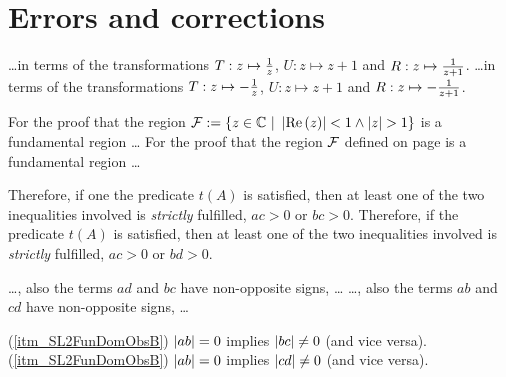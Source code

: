\chapter{Errors and corrections}

\begin{description}
{\dots in terms of the transformations $T : z \mapsto \frac{1}{z}$, $U : z \mapsto z+1$ and $R : z \mapsto \frac{1}{z+1}$.}
{\dots in terms of the transformations $T : z \mapsto -\frac{1}{z}$, $U : z \mapsto z+1$ and $R : z \mapsto -\frac{1}{z+1}$.}

{For the proof that the region $\mathcal{F} := \{ z \in \mathbb{C} \ | \ \left|\operatorname{Re}\left(z\right)\right| < 1 \land \left|z\right| > 1 \}$ is a fundamental region \dots}
{For the proof that the region $\mathcal{F}$ defined on page \pageref{eqn_PSL2FunDom} is a fundamental region \dots}

{Therefore, if one the predicate $t(A)$ is satisfied, then at least one of the two inequalities involved is \emph{strictly} fulfilled, \ie $ac > 0$ or $bc > 0$.}
{Therefore, if the predicate $t(A)$ is satisfied, then at least one of the two inequalities involved is \emph{strictly} fulfilled, \ie $ac > 0$ or $bd > 0$.}

{\dots, \ie also the terms $ad$ and  $bc$ have non-opposite signs, \dots}
{\dots, \ie also the terms $ab$ and $cd$ have non-opposite signs, \dots}

{(\ref{itm_SL2FunDomObsB})\quad
$\left|ab\right| = 0$ implies $\left|bc\right| \ne 0$ (and vice versa).}
{(\ref{itm_SL2FunDomObsB})\quad
$\left|ab\right| = 0$ implies $\left|cd\right| \ne 0$ (and vice versa).}
\end{description}
